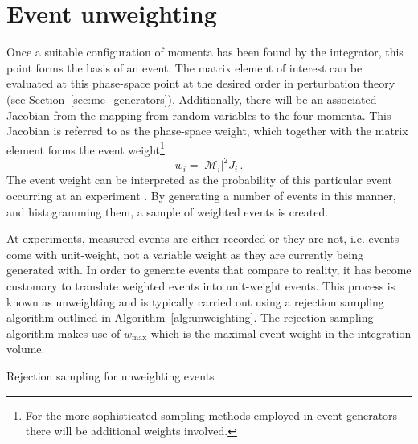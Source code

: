 \documentclass[main.tex]{subfiles}
\begin{document}
    \section{Event unweighting}\label{sec:unweighting}
    Once a suitable configuration of momenta
    has been found by the integrator, this point forms the basis of an
    event. The matrix element of interest can be evaluated at
    this phase-space point at the desired order in perturbation
    theory (see Section~\ref{sec:me_generators}). Additionally, there will be an associated Jacobian
    from the mapping from random variables to the four-momenta.
    This Jacobian is referred to as the phase-space weight, which together
    with the matrix element forms the event weight\footnote{For
    the more sophisticated sampling methods employed in event generators
    there will be additional weights involved.}
    \begin{equation}\label{eqn:event_weight}
        w_{i} = |\mathcal{M}_{i}|^{2} J_{i} \, .
    \end{equation}
    The event weight can be interpreted as the probability
    of this particular event occurring at an experiment \cite{Plehn:2009nd}.
    By generating a number of events in this manner,
    and histogramming them, a sample of weighted events is created.
    
    At experiments, measured events are either recorded
    or they are not, i.e. events come with unit-weight,
    not a variable weight as they are currently being
    generated with. In order to generate events that
    compare to reality, it has become customary to translate
    weighted events into unit-weight events.
    This process is known as unweighting and is typically
    carried out using a rejection sampling algorithm
    outlined in Algorithm~\ref{alg:unweighting}. The rejection
    sampling algorithm makes use of $w_{\mathrm{max}}$ which is the
    maximal event weight in the integration volume.

    \begin{algorithm}
        \caption{Rejection sampling for unweighting events}\label{alg:unweighting}
    \end{algorithm}
\end{document}
